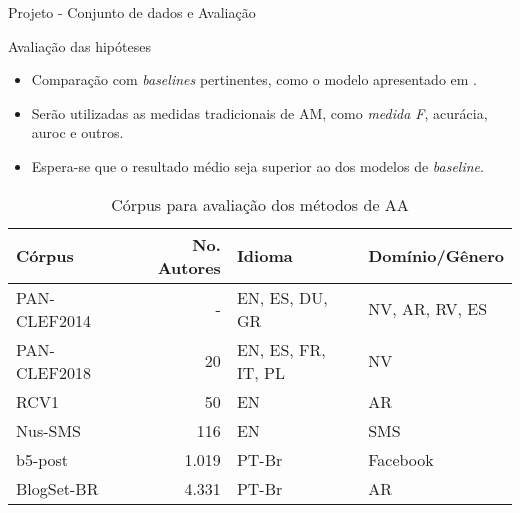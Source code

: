 \begin{frame}{Projeto - Conjunto de dados e Avaliação}

\begin{block}{Avaliação das hipóteses}
	\begin{itemize}
		\item Comparação com {\it baselines} pertinentes, como o modelo apresentado em .
		\item Serão utilizadas as medidas tradicionais de AM, como {\it medida F}, acurácia, auroc e outros.
		\item Espera-se que o resultado médio seja superior ao dos modelos de {\it baseline}.
	\end{itemize}
\end{block}

\setlength{\tabcolsep}{4pt}\selectFont
\begin{table}[!htbp]
	\centering
	\caption{Córpus para avaliação dos métodos de AA}
	\begin{tabular}{l|rll}
		\toprule
		Córpus       & No. Autores & Idioma             & Domínio/Gênero \\ \midrule
		PAN-CLEF2014 &           - & EN, ES, DU, GR     & NV, AR, RV, ES \\ \hline
		PAN-CLEF2018 &          20 & EN, ES, FR, IT, PL & NV             \\ \hline
		RCV1         &          50 & EN                 & AR             \\ \hline
		Nus-SMS      &         116 & EN                 & SMS            \\ \hline
		b5-post      &       1.019 & PT-Br              & Facebook       \\ \hline
		BlogSet-BR   &       4.331 & PT-Br              & AR             \\ \bottomrule
	\end{tabular}
	\label{tab.results}
\end{table}

\end{frame}




